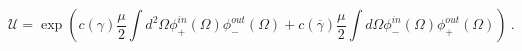 \begin{equation}
\mathcal{U}=
\exp\left(c(\gamma)\frac{\mu}{2}\int d^2\Omega 
\phi^{in}_+(\Omega)\phi^{out}_-(\Omega)+
c(\overline{\gamma})\frac{\mu}{2}
\int d\Omega \phi^{in}_-(\Omega)
\phi^{out}_+(\Omega)\right) \  .
\end{equation}

